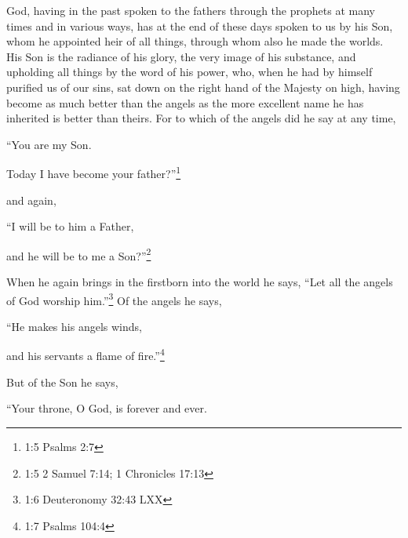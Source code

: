 \newpage
\null
\thispagestyle{empty}
\newpage






\vspace{-1.36in}

\mychapter{} \myverse*{}God, having in the past spoken to the fathers through the prophets
at many times and in various ways,
\myverse{}has at the end of these days spoken to us by his Son, whom he appointed heir
of all things, through whom also he made the worlds.
\myverse{}His Son is the radiance of his glory, the very image of his substance, and upholding
all things by the word of his power, who, when he had by himself purified us of our sins, sat down on
the right hand of the Majesty on high,
\myverse{}having become as much better than the angels as the more excellent name he has
inherited is better than theirs.
\myverse{}For to which of the angels did he say at any time,

“You are my Son.

Today I have become your father?”\footnote{1:5 Psalms 2:7}

and again,

“I will be to him a Father,

and he will be to me a Son?”\footnote{1:5 2 Samuel 7:14;
	1 Chronicles 17:13}

\myverse{}When he again brings in the firstborn into the world he says, “Let
all the angels of God worship him.”\footnote{1:6 Deuteronomy 32:43 LXX}
\myverse{}Of the angels he says,

“He makes his angels winds,

and his servants a flame of fire.”\footnote{1:7 Psalms 104:4}

\myverse{}But of the Son he says,

“Your throne, O God, is forever and ever.

